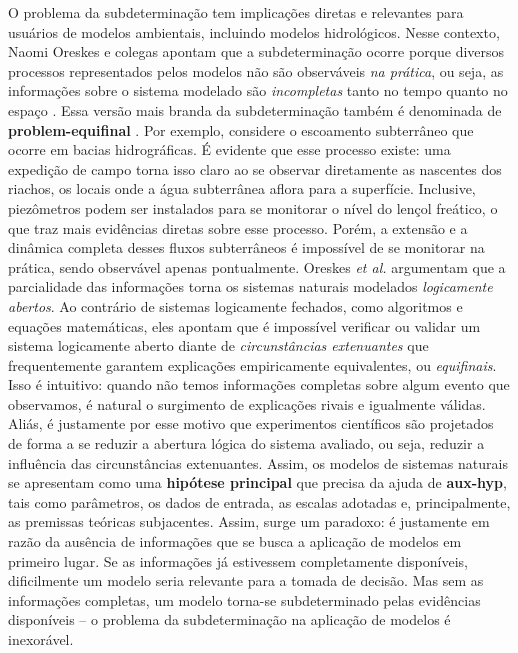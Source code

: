 \documentclass[./main.tex]{subfiles}
\begin{document}
\par O problema da subdeterminação tem implicações diretas e relevantes para usuários de modelos ambientais, incluindo modelos hidrológicos. Nesse contexto, Naomi Oreskes e colegas apontam que a subdeterminação ocorre porque diversos processos representados pelos modelos não são observáveis \textit{na prática}, ou seja, as informações sobre o sistema modelado são \textit{incompletas} tanto no tempo quanto no espaço \cite{Oreskes1994}. Essa versão mais branda da subdeterminação também é denominada de \textbf{\gls{problem-equifinal}} \cite{Beven2006}. Por exemplo, considere o escoamento subterrâneo que ocorre em bacias hidrográficas. É evidente que esse processo existe: uma expedição de campo torna isso claro ao se observar diretamente as nascentes dos riachos, os locais onde a água subterrânea aflora para a superfície. Inclusive, piezômetros podem ser instalados para se monitorar o nível do lençol freático, o que traz mais evidências diretas sobre esse processo. Porém, a extensão e a dinâmica completa desses fluxos subterrâneos é impossível de se monitorar na prática, sendo observável apenas pontualmente. Oreskes \textit{et al.} argumentam que a parcialidade das informações torna os sistemas naturais modelados \textit{logicamente abertos}. Ao contrário de sistemas logicamente fechados, como algoritmos e equações matemáticas, eles apontam que é impossível verificar ou validar um sistema logicamente aberto diante de \textit{circunstâncias extenuantes} que frequentemente garantem explicações empiricamente equivalentes, ou \textit{equifinais}. Isso é intuitivo: quando não temos informações completas sobre algum evento que observamos, é natural o surgimento de explicações rivais e igualmente válidas. Aliás, é justamente por esse motivo que experimentos científicos são projetados de forma a se reduzir a abertura lógica do sistema avaliado, ou seja, reduzir a influência das circunstâncias extenuantes. Assim, os modelos de sistemas naturais se apresentam como uma \textbf{hipótese principal} que precisa da ajuda de \textbf{\gls{aux-hyp}}, tais como parâmetros, os dados de entrada, as escalas adotadas e, principalmente, as premissas teóricas subjacentes. Assim, surge um paradoxo: é justamente em razão da ausência de informações que se busca a aplicação de modelos em primeiro lugar. Se as informações já estivessem completamente disponíveis, dificilmente um modelo seria relevante para a tomada de decisão. Mas sem as informações completas, um modelo torna-se subdeterminado pelas evidências disponíveis -- o problema da subdeterminação na aplicação de modelos é inexorável.
\end{document}
